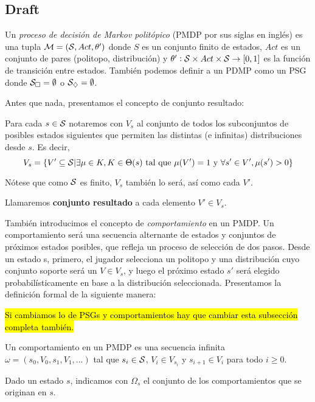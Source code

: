 \subsection{Draft}

\begin{definition}
	Un \textit{proceso de decisión de Markov politópico} (PMDP por sus siglas en inglés) es una tupla $\mathcal{M} = (\mathcal{S}, Act, \theta')$ donde $S$ es un conjunto finito de estados, $Act$ es un conjunto de pares (politopo, distribución) y $\theta': \mathcal{S} \times Act \times \mathcal{S} \rightarrow [0, 1]$ es la función de transición entre estados. También podemos definir a un PDMP como un PSG donde $\mathcal{S}_\square = \emptyset$ o $\mathcal{S}_\diamondsuit = \emptyset$.
\end{definition}

Antes que nada, presentamos el concepto de conjunto resultado:

\begin{definition}
	Para cada $s \in \mathcal{S}$ notaremos con $V_s$ al conjunto de todos los subconjuntos de posibles estados siguientes que permiten las distintas (e infinitas) distribuciones desde $s$. Es decir,
	\begin{equation}\label{definicionVs}
		V_s = \{V' \subseteq \mathcal{S} | \exists \mu \in K, K \in \Theta(s) \text{ tal que } \mu(V') = 1 \text{ y } \forall s' \in V', \mu(s') > 0\}
	\end{equation}

	Nótese que como $\mathcal{S}$ es finito, $V_s$ también lo será, así como cada $V'$.

	Llamaremos \textbf{conjunto resultado} a cada elemento $V' \in V_s$.
\end{definition}

También introducimos el concepto de \textit{comportamiento} en un PMDP. Un
comportamiento será una secuencia alternante de estados y conjuntos de próximos
estados posibles, que refleja un proceso de selección de dos pasos. Desde un
estado s, primero, el jugador selecciona un politopo y una distribución cuyo
conjunto soporte será un $V \in V_s$, y luego el próximo estado $s'$ será
elegido probabilísticamente en base a la distribución seleccionada. Presentamos
la definición formal de la siguiente manera:

\hl{Si cambiamos lo de PSGs y comportamientos hay que cambiar esta subsección completa también.}

\begin{definition}[comportamiento]
	Un comportamiento en un PMDP es una secuencia infinita $\omega = (s_0, V_0, s_1, V_1, ...)$ tal que $s_i \in \mathcal{S}$, $V_i \in V_{s_i}$ y $s_{i+1} \in V_i$ para todo $i \geq 0$.

	Dado un estado $s$, indicamos con $\Omega_s$ el conjunto de los comportamientos
	que se originan en $s$.
\end{definition}

